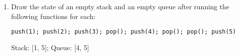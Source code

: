 \documentclass[11pt]{article}
\begin{document}
\begin{enumerate}
        \item Draw the state of an empty stack and an empty queue after running the following functions for each:
\begin{verbatim}
push(1); push(2); push(3); pop(); push(4); pop(); pop(); push(5)
\end{verbatim}
Stack: [1, 5]; Queue: [4, 5]
    \end{enumerate}
    \label{r:lastpage}
    
\end{document}
